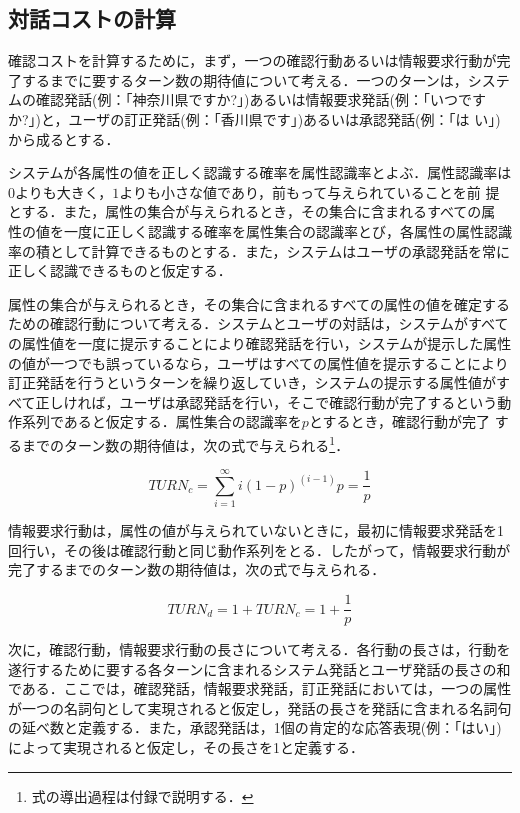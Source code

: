 \subsection{対話コストの計算}
\label{sec-cost}

確認コストを計算するために，まず，一つの確認行動あるいは情報要求行動が完
了するまでに要するターン数の期待値について考える．一つのターンは，システ
ムの確認発話(例：「神奈川県ですか?」)あるいは情報要求発話(例：「いつです
か?」)と，ユーザの訂正発話(例：「香川県です」)あるいは承認発話(例：「は
い」)から成るとする．

システムが各属性の値を正しく認識する確率を属性認識率とよぶ．属性認識率は
$0$よりも大きく，$1$よりも小さな値であり，前もって与えられていることを前
提とする．また，属性の集合が与えられるとき，その集合に含まれるすべての属
性の値を一度に正しく認識する確率を属性集合の認識率とび，各属性の属性認識
率の積として計算できるものとする．また，システムはユーザの承認発話を常に
正しく認識できるものと仮定する．

属性の集合が与えられるとき，その集合に含まれるすべての属性の値を確定する
ための確認行動について考える．システムとユーザの対話は，システムがすべて
の属性値を一度に提示することにより確認発話を行い，システムが提示した属性
の値が一つでも誤っているなら，ユーザはすべての属性値を提示することにより
訂正発話を行うというターンを繰り返していき，システムの提示する属性値がす
べて正しければ，ユーザは承認発話を行い，そこで確認行動が完了するという動
作系列であると仮定する．属性集合の認識率を$p$とするとき，確認行動が完了
するまでのターン数の期待値は，次の式で与えられる\cite{YDK:01}\footnote
{式の導出過程は付録で説明する．}．

\begin{equation}
\label{turnc-label}
TURN_{c} = \sum_{i=1}^{\infty}i(1-p)^{(i-1)}p = \frac{1}{p}
\end{equation}

情報要求行動は，属性の値が与えられていないときに，最初に情報要求発話を1 
回行い，その後は確認行動と同じ動作系列をとる．したがって，情報要求行動が
完了するまでのターン数の期待値は，次の式で与えられる．

\begin{equation}
TURN_{d} = 1+ TURN_{c} = 1+\frac{1}{p}
\end{equation}

次に，確認行動，情報要求行動の長さについて考える．各行動の長さは，行動を
遂行するために要する各ターンに含まれるシステム発話とユーザ発話の長さの和
である．ここでは，確認発話，情報要求発話，訂正発話においては，一つの属性
が一つの名詞句として実現されると仮定し，発話の長さを発話に含まれる名詞句
の延べ数と定義する．また，承認発話は，1個の肯定的な応答表現(例：「はい」) 
によって実現されると仮定し，その長さを1と定義する．

